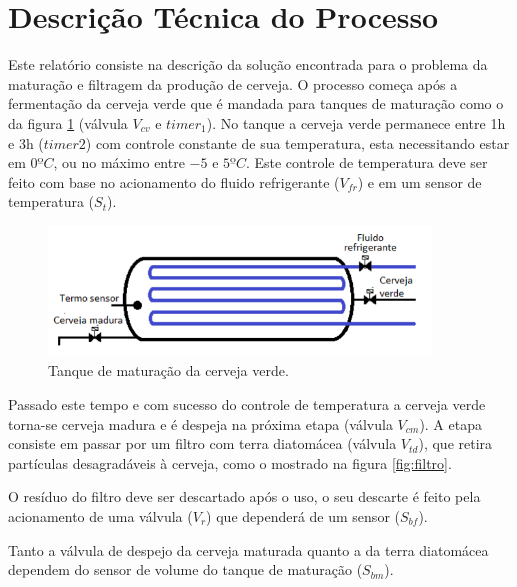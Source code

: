 \documentclass[12pt]{article}
\begin{document}
	
	
	\tableofcontents
	
	\clearpage
	
	\section{Descrição Técnica do Processo}
	
	Este relatório consiste na descrição da solução encontrada para o problema da maturação e filtragem da produção de cerveja. O processo começa após a fermentação da cerveja verde que é mandada para tanques de maturação como o da figura \ref{fig:maturador} (válvula $V_{cv}$ e $timer_1$). No tanque a cerveja verde permanece entre 1h e 3h ($timer2$) com controle constante de sua temperatura, esta necessitando estar em $0ºC$, ou no máximo entre $-5$ e $5ºC$. Este controle de temperatura deve ser feito com base no acionamento do fluido refrigerante ($V_{fr}$) e em um sensor de temperatura ($S_t$).
	
	\begin{figure}[H]
		\centering
		\includegraphics [width=4in]{tanque.png}
		\caption {Tanque de maturação da cerveja verde.}
		\label{fig:maturador}
	\end{figure}
	
	Passado este tempo e com sucesso do controle de temperatura a cerveja verde torna-se cerveja madura e é despeja na próxima etapa (válvula $V_{cm}$). A etapa consiste em passar por um filtro com terra diatomácea (válvula $V_{td}$), que retira partículas desagradáveis à cerveja, como o mostrado na figura \ref{fig:filtro}. 
	
	O resíduo do filtro deve ser descartado após o uso, o seu descarte é feito pela acionamento de uma válvula ($V_r$) que dependerá de um sensor ($S_{bf}$).
	
	
	Tanto a válvula de despejo da cerveja maturada quanto a da terra diatomácea dependem do sensor de volume do tanque de maturação ($S_{bm}$).
	
\end{document}
